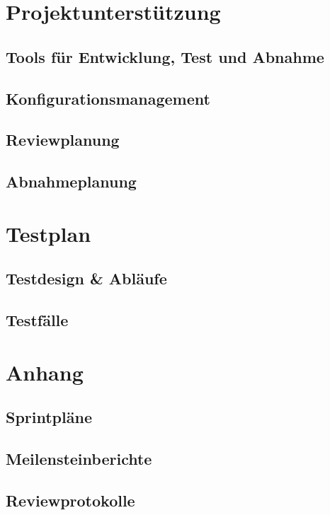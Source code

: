 \documentclass[11pt,a4paper]{scrreprt}
\begin{document}
\chapter{Projektunterstützung}

\section{Tools für Entwicklung, Test und Abnahme}

\section{Konfigurationsmanagement}

\section{Reviewplanung}

\section{Abnahmeplanung}

\chapter{Testplan}

\section{Testdesign \& Abläufe}

\section{Testfälle}

\appendix

\chapter{Anhang}

\section{Sprintpläne}

\section{Meilensteinberichte}

\section{Reviewprotokolle}
\end{document}
